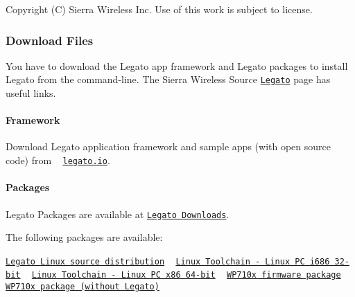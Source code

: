 Copyright (C) Sierra Wireless Inc. Use of this work is subject to license. \hypertarget{getstartedDwnLd}{}\subsubsection{Download Files}\label{getstartedDwnLd}
You have to download the Legato app framework and Legato packages to install Legato from the command-\/line. The Sierra Wireless Source \href{http://source.sierrawireless.com/legato/}{\tt Legato} page has useful links.\hypertarget{getstarted_dwn_ld_getstartedDwnLdPkgs_legato_io}{}\paragraph{Framework}\label{getstarted_dwn_ld_getstartedDwnLdPkgs_legato_io}
Download Legato application framework and sample apps (with open source code) from ~\newline
 \href{http://www.legato.io/}{\tt legato.\+io}.\hypertarget{getstarted_dwn_ld_getstartedDwnLdPkgs_framework}{}\paragraph{Packages}\label{getstarted_dwn_ld_getstartedDwnLdPkgs_framework}
Legato Packages are available at \href{http://source.sierrawireless.com/resources/legato/downloads/}{\tt Legato Downloads}.

The following packages are available\+:

\href{http://source.sierrawireless.com/resources/legato/legatolinuxdist/}{\tt Legato Linux source distribution} ~\newline
 \href{http://source.sierrawireless.com/resources/legato/linuxtoolchain32bit/}{\tt Linux Toolchain -\/ Linux P\+C i686 32-\/bit} ~\newline
 \href{http://source.sierrawireless.com/resources/legato/linuxtoolchain64bit/}{\tt Linux Toolchain -\/ Linux P\+C x86 64-\/bit} ~\newline
 \href{http://source.sierrawireless.com/resources/legato/wp7firmware/}{\tt W\+P710x firmware package} ~\newline
 \href{http://source.sierrawireless.com/resources/legato/wp7withoutLegato/}{\tt W\+P710x package (without Legato)}





